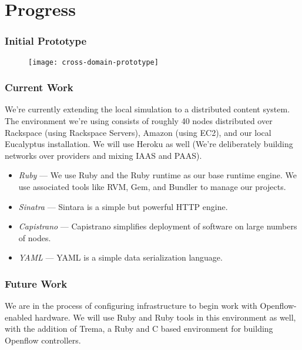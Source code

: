 \section{Progress}

\begin{frame}
\frametitle{Initial Prototype}
\begin{figure}
\centering
\texttt{[image: cross-domain-prototype]}
\label{fig:implementation:prototype}
\end{figure}
\end{frame}

\begin{frame}
\frametitle{Current Work}
We're currently extending the local simulation to a distributed content system.  The environment we're using consists of roughly 40 nodes distributed over Rackspace (using Rackspace Servers), Amazon (using EC2), and our local Eucalyptus installation.  We will use Heroku as well (We're deliberately building networks over providers and mixing IAAS and PAAS).
\newline
\pause
\begin{itemize}
\item \textit{Ruby} --- We use Ruby and the Ruby runtime as our base runtime engine.  We use associated tools like RVM, Gem, and Bundler to manage our projects.
\pause
\item \textit{Sinatra} --- Sintara is a simple but powerful HTTP engine.
\pause
\item \textit{Capistrano} --- Capistrano simplifies deployment of software on large numbers of nodes.
\pause
\item \textit{YAML} --- YAML is a simple data serialization language.
\end{itemize}
\end{frame}

\begin{frame}[c]
\frametitle{Future Work}
We are in the process of configuring infrastructure to begin work with Openflow-enabled hardware.  We will use Ruby and Ruby tools in this environment as well, with the addition of Trema, a Ruby and C based environment for building Openflow controllers.
\end{frame}